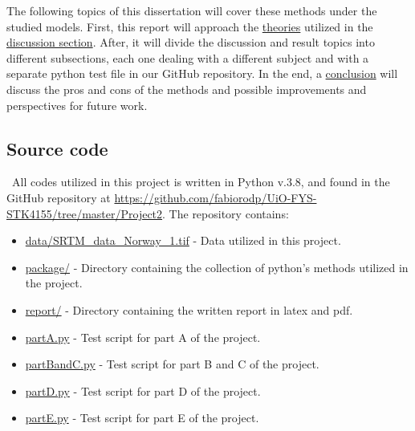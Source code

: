 The following topics of this dissertation will cover these methods under the studied models. First, this report will approach the \hyperref[chap:Theory]{theories} utilized in the \hyperref[chap:Discussion]{discussion section}. After, it will divide the discussion and result topics into different subsections, each one dealing with a different subject and with a separate python test file in our GitHub repository. In the end, a \hyperref[chap:Conclusion]{conclusion} will discuss the pros and cons of the methods and possible improvements and perspectives for future work.

\subsection{Source code}
\label{chap:Source code}

\quad \, All codes utilized in this project is written in Python v.3.8, and found in the GitHub repository at \href{https://github.com/fabiorodp/UiO-FYS-STK4155/tree/master/Project2}{https://github.com/fabiorodp/UiO-FYS-STK4155/tree/master/Project2}. The repository contains:

\begin{itemize}
\item \href{https://github.com/fabiorodp/UiO-FYS-STK4155/tree/master/Project2/data/SRTM_data_Norway_1.tif}{data/SRTM\_data\_Norway\_1.tif} - Data utilized in this project.
\item \href{https://github.com/fabiorodp/UiO-FYS-STK4155/tree/master/Project2/package/}{package/} - Directory containing the collection of python's methods utilized in the project.
\item \href{https://github.com/fabiorodp/UiO-FYS-STK4155/tree/master/Project2/report/}{report/} - Directory containing the written report in latex and pdf.
\item \href{https://github.com/fabiorodp/UiO-FYS-STK4155/tree/master/Project2/partA.py}{partA.py} - Test script for part A of the project.
\item \href{https://github.com/fabiorodp/UiO-FYS-STK4155/tree/master/Project2/partBandC.py}{partBandC.py} - Test script for part B and C of the project.
\item \href{https://github.com/fabiorodp/UiO-FYS-STK4155/tree/master/Project2/partD.py}{partD.py} - Test script for part D of the project.
\item \href{https://github.com/fabiorodp/UiO-FYS-STK4155/tree/master/Project2/partE.py}{partE.py} - Test script for part E of the project.
\end{itemize}
